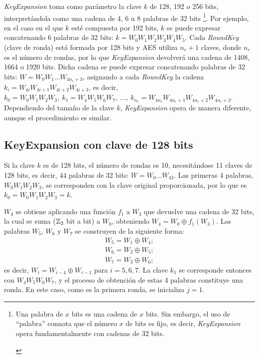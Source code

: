 \textit{KeyExpansion} toma como parámetro la clave $k$ de 128, 192 o 256 bits, interpretándola como una cadena de 4, 6 u 8 palabras de 32 bits \footnote{
\begin{Revision}Una palabra de $x$ bits es una cadena de $x$ bits. Sin embargo, el uso de ``palabra'' connota que el número $x$ de bits es fijo, es decir, \textit{KeyExpansion} opera fundamentalmente con cadenas de 32 bits.\end{Revision}
}.
Por ejemplo, en el caso en el que $k$ esté compuesta por 192 bits, $k$ se puede expresar concatenando 6 palabras de 32 bits: $k = W_0W_1W_2W_3W_4W_5$. Cada \textit{RoundKey} (clave de ronda) está formada por 128 bits y AES utiliza $n_r + 1$ claves, donde $n_r$ es el número de rondas, por lo que \textit{KeyExpansion} devolverá una cadena de 1408, 1664 o 1920 bits. Dicha cadena se puede expresar concatenando palabras de 32 bits: $W = W_0W_1\ldots W_{4n_r+3}$, asignando a cada \textit{RoundKey} la cadena $k_i = W_{4i}W_{4i+1}W_{4i+2}W_{4i+3}$, es decir, $k_0 = W_0W_1W_2W_3,\ k_1 = W_4W_5W_6W_7,\ \ldots  ,\ k_{n_r} = W_{4n_r}W_{4n_r+1}W_{4n_r+2}W_{4n_r+3}$. Dependiendo del tamaño de la clave $k$, \textit{KeyExpansion} opera de manera diferente, aunque el procedimiento es similar. 

\vspace{-0.5em}
\subsection{KeyExpansion con clave de 128 bits}
Si la clave $k$ es de 128 bits, el número de rondas es 10, necesitándose 11 claves de 128 bits, es decir, 44 palabras de 32 bits: $W = W_0\ldots W_{43}$. Las primeras 4 palabras, $W_0W_1W_2W_3$, se corresponden con la clave original proporcionada, por lo que es $k_0 = W_0W_1W_2W_3 = k$. 

$W_4$ se obtiene aplicando una función $f_1$ a $W_3$ que devuelve una cadena de 32 bits, la cual se suma ($\mathbb{Z}_2$ bit a bit) a $W_0$, obteniendo $W_4 = W_0\oplus f_1(W_3) $. Las palabras $W_5$, $W_6$ y $W_7$ se construyen de la siguiente forma:
\vspace{-1em}
\begin{align*}
    W_5 = W_1  \oplus W_4;\\ W_6 = W_2  \oplus W_5;\\W_7 = W_3  \oplus W_6;
\end{align*}
es decir, $W_i = W_{i-4} \oplus W_{i-1}$ para $i = 5,6,7$. La clave $k_1$ se corresponde entonces con $W_4W_5W_6W_7$, y el proceso de obtención de estas 4 palabras constituye una ronda. En este caso, como es la primera ronda, se inicializa $j = 1$.

